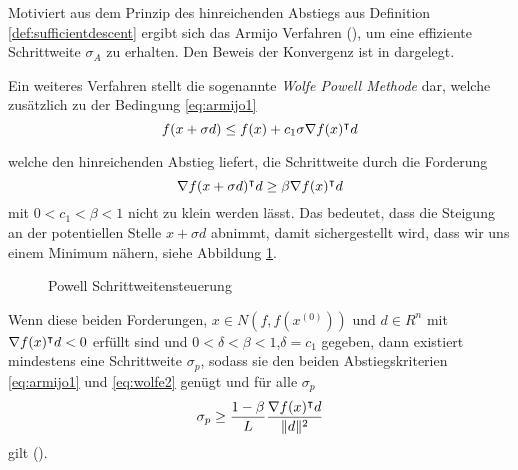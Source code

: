 Motiviert aus dem Prinzip des hinreichenden Abstiegs aus Definition \ref{def:sufficientdescent} ergibt sich das Armijo Verfahren (\cite[Verfahren 4.5.4]{alt2002nichtlineare}), um eine effiziente Schrittweite $\sigma_A$ zu erhalten.
Den Beweis der Konvergenz ist in  \cite[Satz 4.5.5]{alt2002nichtlineare} dargelegt.

Ein weiteres Verfahren stellt die sogenannte \textit{Wolfe Powell Methode} dar, welche zusätzlich zu der Bedingung \eqref{eq:armijo1}
\begin{equation}
 f(x+\sigma d) \leq f(x) + c_1\sigma \nabla f(x)^\intercal d
\end{equation}

welche den hinreichenden Abstieg liefert, die Schrittweite durch die Forderung
\begin{equation}
\label{eq:wolfe2}
 \nabla f(x+\sigma d)^\intercal d\geq \beta \nabla f(x)^\intercal d
\end{equation}
mit $0<c_1<\beta<1$ nicht zu klein werden lässt. Das bedeutet, dass die Steigung an der potentiellen Stelle $x+\sigma d$ abnimmt, damit sichergestellt wird, dass wir uns einem Minimum nähern, siehe Abbildung \ref{fig:powell}. 

\begin{figure}
\centering

\caption{Powell Schrittweitensteuerung}
\label{fig:powell}
\end{figure}
Wenn diese beiden Forderungen, $x\in N(f,f(x^{(0)}))$ und $d\in R^n$ mit $\nabla f(x)^\intercal d<0$ erfüllt sind und $0<\delta<\beta<1$,$\delta =c_1$ gegeben, dann existiert mindestens eine Schrittweite $\sigma_p$, sodass sie den beiden Abstiegskriterien \eqref{eq:armijo1} und \eqref{eq:wolfe2} genügt und für alle $\sigma_p$
\[
 \sigma_p \geq \frac{1-\beta}{L}\frac{\nabla f(x)^\intercal d}{\|d\|^2}
\]
gilt (\cite[Satz 4.5.8.]{alt2002nichtlineare}).

